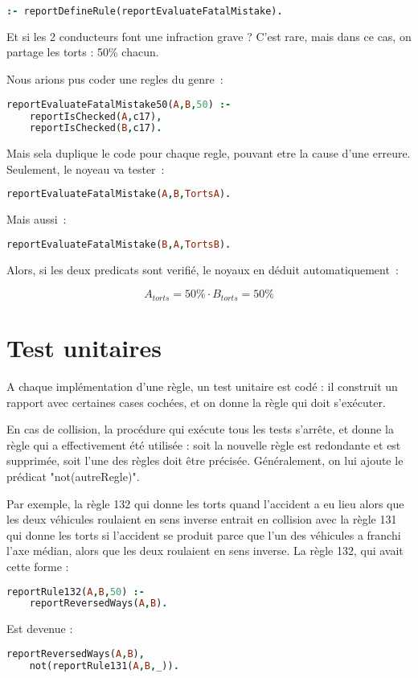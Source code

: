 \begin{lstlisting}[language=Prolog,frame=single]
:- reportDefineRule(reportEvaluateFatalMistake).
\end{lstlisting}

Et si les 2 conducteurs font une infraction grave ?
C'est rare, mais dans ce cas, on partage les torts : 50\% chacun.

Nous arions pus coder une regles du genre~:

\begin{lstlisting}[language=Prolog,frame=single]
reportEvaluateFatalMistake50(A,B,50) :-
    reportIsChecked(A,c17),
    reportIsChecked(B,c17).
\end{lstlisting}

Mais sela duplique le code pour chaque regle, pouvant etre la cause d'une erreure. Seulement, le noyeau va tester~:

\begin{lstlisting}[language=Prolog,frame=single]
reportEvaluateFatalMistake(A,B,TortsA).
\end{lstlisting}

Mais aussi~:

\begin{lstlisting}[language=Prolog,frame=single]
reportEvaluateFatalMistake(B,A,TortsB).
\end{lstlisting}

Alors, si les deux predicats sont verifi\'e, le noyaux en d\'eduit automatiquement~:

\[A_{torts} = 50\% \cdot B_{torts} = 50\%\]

\section{Test unitaires}

A chaque implémentation d'une règle, un test unitaire est codé : il construit un rapport avec certaines cases cochées, et on donne la règle qui doit s'exécuter.

En cas de collision, la procédure qui exécute tous les tests s'arrête, et donne la règle qui a effectivement été utilisée : soit la nouvelle règle est redondante et est supprimée, soit l'une des règles doit être précisée. Généralement, on lui ajoute le prédicat "not(autreRegle)".

Par exemple, la règle 132 qui donne les torts quand l'accident a eu lieu alors que les deux véhicules roulaient en sens inverse entrait en collision avec la règle 131 qui donne les torts si l'accident se produit parce que l'un des véhicules a franchi l'axe médian, alors que les deux roulaient en sens inverse.
La règle 132, qui avait cette forme :

\begin{lstlisting}[language=Prolog,frame=single]
reportRule132(A,B,50) :-
    reportReversedWays(A,B).
\end{lstlisting}

Est devenue :

\begin{lstlisting}[language=Prolog,frame=single]
reportReversedWays(A,B),
    not(reportRule131(A,B,_)).
\end{lstlisting}


